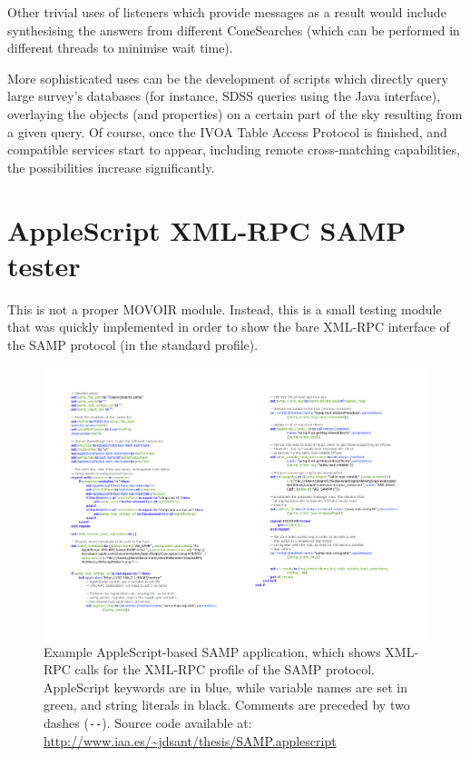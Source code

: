 			Other trivial uses of  listeners
			which provide  messages as a
			result would include synthesising the answers from
			different ConeSearches (which can be performed in
			different threads to minimise wait time).
			
			More sophisticated uses can be the development of scripts
			which directly query large survey's databases (for
			instance, SDSS queries using the  Java
			interface), overlaying the objects (and properties) on a
			certain part of the sky resulting from a given query. Of
			course, once the IVOA Table Access Protocol is finished,
			and compatible services start to appear, including
			remote cross-matching capabilities, the possibilities
			increase significantly.
			
			
		
	
	\section{AppleScript XML-RPC SAMP tester} %
	\label{sec:applescript_xml_rpc_samp_tester}
		
		This is not a proper MOVOIR module. Instead, this is a small
		testing module that was quickly implemented in order to show
		the bare XML-RPC interface of the SAMP protocol (in the
		standard profile).
		
		\begin{figure}[tbp]
			\centering
				\includegraphics[width=\textwidth]
				{fig/AS_SAMP.pdf}
			\caption[Example AppleScript-based SAMP application]
			{
				Example AppleScript-based SAMP application, which
				shows XML-RPC calls for the XML-RPC profile of the
				SAMP protocol. AppleScript keywords are in blue,
				while variable names are set in green, and string
				literals in black. Comments are preceded by two
				dashes (\texttt{-}\texttt{-}). Source code
				available at:
			\url{http://www.iaa.es/~jdsant/thesis/SAMP.applescript}
			}
			\label{fig:fig_AS_SAMP}
		\end{figure}
		

